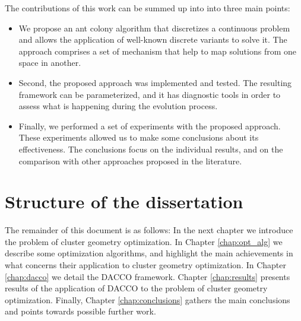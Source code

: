 The contributions of this work can be summed up into into three main points:
\begin{itemize}
	\item We propose an ant colony algorithm that discretizes a continuous problem and allows the application of well-known discrete variants to solve it. The approach comprises a set of mechanism that help to map solutions from one space in another.

	\item Second, the proposed approach was implemented and tested. The resulting framework can be parameterized, and it has diagnostic tools in order to assess what is happening during the evolution process. 

	\item Finally, we performed a set of experiments with the proposed approach. These experiments allowed us to make some conclusions about its effectiveness. The conclusions focus on the individual results, and on the comparison with other approaches proposed in the literature.

\end{itemize}

\section{Structure of the dissertation}
The remainder of this document is as follows: In the next chapter we introduce the problem of cluster geometry optimization. In Chapter \ref{chap:opt_alg} we describe some optimization algorithms, and highlight the main achievements in what concerns their application to cluster geometry optimization. In Chapter \ref{chap:dacco} we detail the DACCO framework. Chapter \ref{chap:results} presents results of the application of DACCO to the problem of cluster geometry optimization. Finally, Chapter \ref{chap:conclusions} gathers the main conclusions and points towards possible further work.

